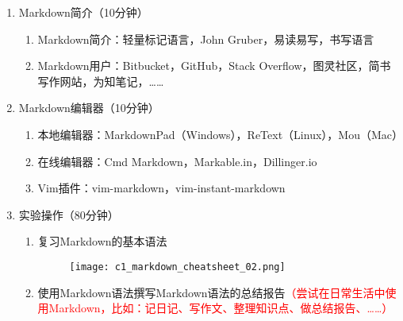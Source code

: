 \documentclass{TIJMUjiaoanSY}
\begin{document}
\firstTail

\newpage
\otherHeader

\begin{enumerate}
  \item Markdown简介（10分钟）
    \begin{enumerate}
      \item Markdown简介：轻量标记语言，John Gruber，易读易写，书写语言
      \item Markdown用户：Bitbucket，GitHub，Stack Overflow，图灵社区，简书写作网站，为知笔记，……
    \end{enumerate}
  \item Markdown编辑器（10分钟）
    \begin{enumerate}
      \item 本地编辑器：MarkdownPad（Windows），ReText（Linux），Mou（Mac）
      \item 在线编辑器：Cmd Markdown，Markable.in，Dillinger.io
      \item Vim插件：vim-markdown，vim-instant-markdown
    \end{enumerate}
  \item 实验操作（80分钟）
    \begin{enumerate}
      \item 复习Markdown的基本语法
    \begin{figure}[h]
      \centering
      \texttt{[image: c1\_markdown\_cheatsheet\_02.png]}
    \end{figure}
  \item
    使用Markdown语法撰写Markdown语法的总结报告\textcolor{red}{（尝试在日常生活中使用Markdown，比如：记日记、写作文、整理知识点、做总结报告、……）}
    \end{enumerate}
\end{enumerate}

\otherTail
\end{document}
